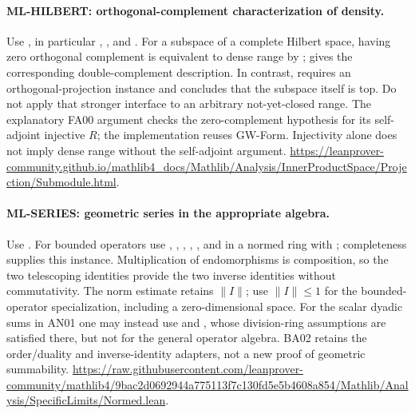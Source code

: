 \documentclass[11pt,a4paper]{article}
\theoremstyle{remark}\newtheorem{remark}[theorem]{Remark}
\begin{document}
\hypertarget{leaf:ML-HILBERT}{}\paragraph{ML-HILBERT: orthogonal-complement characterization of density.}
Use , in particular
,
, and
.
For a subspace of a complete Hilbert space, having zero orthogonal complement is equivalent to dense range by ;  gives the corresponding double-complement description. In contrast,  requires an orthogonal-projection instance and concludes that the subspace itself is top. Do not apply that stronger interface to an arbitrary not-yet-closed range. The explanatory FA00 argument checks the zero-complement hypothesis for its self-adjoint injective $R$; the implementation reuses GW-Form. Injectivity alone does not imply dense range without the self-adjoint argument.
\url{https://leanprover-community.github.io/mathlib4_docs/Mathlib/Analysis/InnerProductSpace/Projection/Submodule.html}.

\hypertarget{leaf:ML-SERIES}{}\paragraph{ML-SERIES: geometric series in the appropriate algebra.}
Use . For bounded operators use , , , , , and  in a normed ring with ; completeness supplies this instance. Multiplication of endomorphisms is composition, so the two telescoping identities provide the two inverse identities without commutativity. The norm estimate retains $\|I\|$; use $\|I\|\leq1$ for the bounded-operator specialization, including a zero-dimensional space. For the scalar dyadic sums in AN01 one may instead use  and , whose division-ring assumptions are satisfied there, but not for the general operator algebra. BA02 retains the order/duality and inverse-identity adapters, not a new proof of geometric summability.
\url{https://raw.githubusercontent.com/leanprover-community/mathlib4/9bac2d0692944a775113f7c130fd5e5b4608a854/Mathlib/Analysis/SpecificLimits/Normed.lean}.
\end{document}
